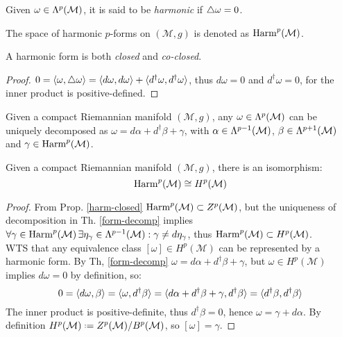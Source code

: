 \begin{definition}
  Given $ \omega \in \Lambda^{p}(\mathcal{M}) $, it is said to be \textit{harmonic} if $ \triangle \omega = 0 $.
\end{definition}

\begin{definition}
  The space of harmonic $ p $-forms on $ (\mathcal{M},g) $ is denoted as $ \mathrm{Harm}^{p}(\mathcal{M}) $.
\end{definition}

\begin{proposition}\label{harm-closed}
  A harmonic form is both \textit{closed} and \textit{co-closed}.
\end{proposition}
\begin{proof}
  $ 0 = \braket{\omega, \triangle \omega} = \braket{d\omega, d\omega} + \braket{d^{\dagger} \omega, d^{\dagger}{\omega}} $, thus $ d\omega = 0 $ and $ d^{\dagger} \omega = 0 $, for the inner product is positive-defined.
\end{proof}

\begin{theorem}\label{form-decomp}
  Given a compact Riemannian manifold $ (\mathcal{M},g) $, any $ \omega \in \Lambda^{p}(\mathcal{M}) $ can be uniquely decomposed as $ \omega = d\alpha + d^{\dagger}\beta + \gamma $, with $ \alpha \in \Lambda^{p-1}(\mathcal{M}) $, $ \beta \in \Lambda^{p+1}(\mathcal{M}) $ and $ \gamma \in \mathrm{Harm}^{p}(\mathcal{M}) $.
\end{theorem}

\begin{theorem}[Hodge]
  Given a compact Riemannian manifold $ (\mathcal{M},g) $, there is an isomorphism:
  \begin{equation}
    \mathrm{Harm}^{p}(\mathcal{M}) \cong H^p(\mathcal{M})
    \label{eq:3.23}
  \end{equation}
\end{theorem}
\begin{proof}
  From Prop. \ref{harm-closed} $ \mathrm{Harm}^{p}(\mathcal{M}) \subset Z^p(\mathcal{M}) $, but the uniqueness of decomposition in Th. \ref{form-decomp} implies $ \forall \gamma \in \mathrm{Harm}^{p}(\mathcal{M}) \,\exists \eta_{\gamma} \in \Lambda^{p-1}(\mathcal{M}) : \gamma \neq d\eta_{\gamma} $, thus $ \mathrm{Harm}^{p}(\mathcal{M}) \subset H^p(\mathcal{M}) $. \\
  WTS that any equivalence class $ [\omega] \in H^p(\mathcal{M}) $ can be represented by a harmonic form. By Th, \ref{form-decomp} $ \omega = d\alpha + d^{\dagger}\beta + \gamma $, but $ \omega \in H^p(\mathcal{M}) $ implies $ d\omega = 0 $ by definition, so:
  \begin{equation*}
    0 = \braket{d\omega, \beta} = \braket{\omega, d^{\dagger} \beta} = \braket{d\alpha + d^{\dagger}\beta + \gamma, d^{\dagger}\beta} = \braket{d^{\dagger} \beta, d^{\dagger} \beta}
  \end{equation*}
  The inner product is positive-definite, thus $ d^{\dagger} \beta = 0 $, hence $ \omega = \gamma + d\alpha $. By definition $ H^p(\mathcal{M}) \defeq Z^p(\mathcal{M}) / B^p(\mathcal{M}) $, so $ [\omega] = \gamma $.
\end{proof}


